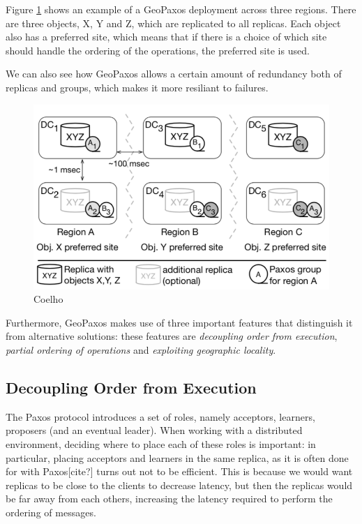 Figure \ref{fig:datacenters} shows an example of a GeoPaxos deployment across three regions. There are three objects, X, Y and Z, which are replicated to all replicas. Each object also has a preferred site, which means that if there is a choice of which site should handle the ordering of the operations, the preferred site is used.

We can also see how GeoPaxos allows a certain amount of redundancy both of replicas and groups, which makes it more resiliant to failures.

\begin{figure}[htb]
  \centering
  \includegraphics[width=\textwidth,height=\textheight,keepaspectratio]{img/datacenters.png}

  \caption[The architecture of the system]{Coelho \texttrademark}
  \label{fig:datacenters}
\end{figure}

Furthermore, GeoPaxos makes use of three important features that distinguish it from alternative solutions: these features are \emph{decoupling order from execution}, \emph{partial ordering of operations} and \emph{exploiting geographic locality}. 

\subsection{Decoupling Order from Execution}
The Paxos protocol introduces a set of roles, namely acceptors, learners, proposers (and an eventual leader). When working with a distributed environment, deciding where to place each of these roles is important: in particular, placing acceptors and learners in the same replica, as it is often done for with Paxos[cite?] turns out not to be efficient. This is because we would want replicas to be close to the clients to decrease latency, but then the replicas would be far away from each others, increasing the latency required to perform the ordering of messages.

